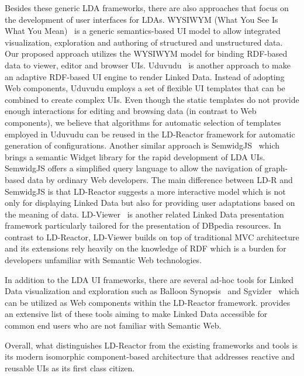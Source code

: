 \documentclass{acm_proc_article-sp}
\begin{document}
Besides these generic LDA frameworks, there are also approaches that focus on the development of user interfaces for LDAs.
WYSIWYM (What You See Is What You Mean)~\cite{WYSIWYM2014} is a generic semantics-based UI model to allow integrated visualization, exploration and authoring of structured and unstructured data.
Our proposed approach utilizes the WYSIWYM model for binding RDF-based data to viewer, editor and browser UIs.
Uduvudu~\cite{Uduvudu2015} is another approach to make an adaptive RDF-based UI engine to render Linked Data.
Instead of adopting Web components, Uduvudu employs a set of flexible UI templates that can be combined to create complex UIs. 
Even though the static templates do not provide enough interactions for editing and browsing data (in contrast to Web components), we believe that algorithms for automatic selection of templates employed in Uduvudu can be reused in the LD-Reactor framework for automatic generation of configurations.
Another similar approach is SemwidgJS~\cite{StegemannZ14} which brings a semantic Widget library for the rapid development of LDA UIs.
SemwidgJS offers a simplified query language to allow the navigation of graph-based data by ordinary Web developers.
The main difference between LD-R and SemwidgJS is that LD-Reactor suggests a more interactive model which is not only for displaying Linked Data but also for providing user adaptations based on the meaning of data.
LD-Viewer~\cite{Lukovnikov2014} is another related Linked Data presentation framework particularly tailored for the presentation of DBpedia resources.
In contrast to LD-Reactor, LD-Viewer  builds on top of traditional MVC architecture and its extensions rely heavily on the knowledge of RDF which is a burden for developers unfamiliar with Semantic Web technologies.

In addition to the LDA UI frameworks, there are several ad-hoc tools for Linked Data visualization and exploration such as Balloon Synopsis~\cite{BalloonSchlegelWSGK14} and Sgvizler~\cite{Sgvizler} which can  be utilized as Web components within the LD-Reactor framework. 
\cite{Abascal2015} provides an extensive list of these tools aiming to make Linked Data accessible for common end users who are not familiar with Semantic Web.

Overall, what distinguishes LD-Reactor from the existing frameworks and tools is its modern isomorphic component-based architecture that addresses reactive and reusable UIs as its first class citizen.
\end{document}
